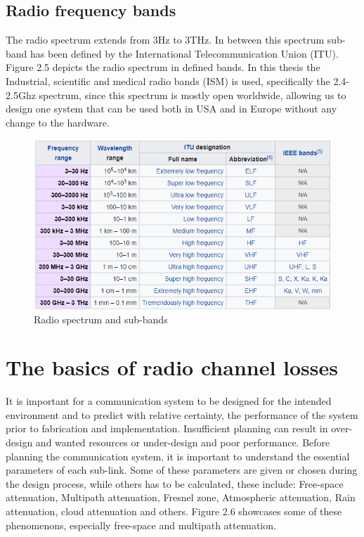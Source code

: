 \subsection{Radio frequency bands}
The radio spectrum extends from 3Hz to 3THz. In between this spectrum sub-band has been defined by the International Telecommunication Union (ITU)\cite{ITU}. Figure 2.5 depicts the radio spectrum in defined bands. In this thesis the Industrial, scientific and medical radio bands (ISM)\cite{ISM} is used, specifically the 2.4-2.5Ghz spectrum, since this spectrum is mostly open worldwide, allowing us to design one system that can be used both in USA and in Europe without any change to the hardware.   
\begin{figure}[h]
\centering
\includegraphics[scale=0.8]{figures/radioSpectrum.PNG}
\caption{Radio spectrum and sub-bands\cite{FrequencyBand}}
\end{figure}

\section{The basics of radio channel losses}
It is important for a communication system to be designed for the intended environment and to predict with relative certainty, the performance of the system prior to fabrication and implementation. Insufficient planning can result in over-design and wanted resources or under-design and poor performance. Before planning the communication system, it is important to understand the essential parameters of each sub-link. Some of these parameters are given or chosen during the design process, while others has to be calculated, these include: Free-space attenuation, Multipath attenuation, Fresnel zone, Atmospheric attenuation, Rain attenuation, cloud attenuation and others. Figure 2.6 showcases some of these phenomenons, especially free-space and multipath attenuation. 

